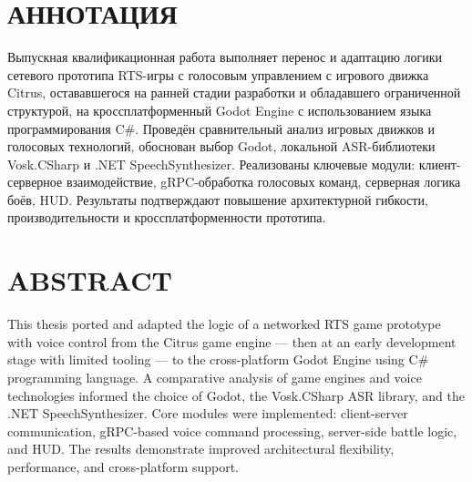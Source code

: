 \section*{АННОТАЦИЯ}

Выпускная квалификационная работа выполняет перенос и адаптацию логики сетевого прототипа RTS-игры с голосовым управлением с игрового движка Citrus, 
остававшегося на ранней стадии разработки и обладавшего ограниченной структурой, на кроссплатформенный Godot Engine с использованием языка программирования C\#. 
Проведён сравнительный анализ игровых движков и голосовых технологий, обоснован выбор Godot, локальной ASR-библиотеки Vosk.CSharp и 
.NET SpeechSynthesizer. Реализованы ключевые модули: клиент-серверное взаимодействие, gRPC-обработка голосовых 
команд, серверная логика боёв, HUD. Результаты подтверждают повышение архитектурной гибкости, производительности и кроссплатформенности прототипа.
\section*{ABSTRACT}

This thesis ported and adapted the logic of a networked RTS game prototype with voice control from the Citrus game engine — then at an early development 
stage with limited tooling — to the cross-platform Godot Engine using C\# programming language. A comparative analysis of game engines and voice technologies informed the
choice of Godot, the Vosk.CSharp ASR library, and the .NET SpeechSynthesizer. Core modules were implemented: client-server communication, gRPC-based voice command processing, server-side battle logic, and HUD. The results demonstrate improved architectural 
flexibility, performance, and cross-platform support.